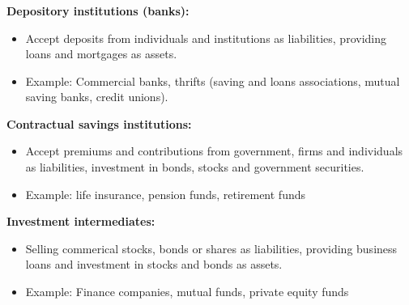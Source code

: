\documentclass[11pt]{beamer}
\begin{document}

\begin{frame}
\frametitle{\insertsection}

\textbf{Depository institutions (banks):}
\begin{itemize}
\item Accept deposits from individuals and institutions as liabilities, providing loans and mortgages as assets.
\item Example: Commercial banks, thrifts (saving and loans associations, mutual saving banks, credit unions).
\end{itemize}

\textbf{Contractual savings institutions:}
\begin{itemize}
\item Accept premiums and contributions from government, firms and individuals as liabilities, investment in bonds, stocks and government securities.
\item Example: life insurance, pension funds, retirement funds
\end{itemize}

\textbf{Investment intermediates:}
\begin{itemize}
\item Selling commerical stocks, bonds or shares as liabilities, providing business loans and investment in stocks and bonds as assets.
\item Example: Finance companies, mutual funds, private equity funds
\end{itemize}

\end{frame}

\end{document}
